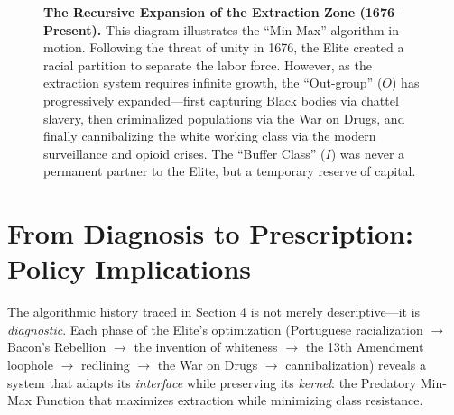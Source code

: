 \documentclass[12pt]{article}
\begin{document}
\begin{figure}[h]
    \caption{\textbf{The Recursive Expansion of the Extraction Zone (1676--Present).} This diagram illustrates the ``Min-Max'' algorithm in motion. Following the threat of unity in 1676, the Elite created a racial partition to separate the labor force. However, as the extraction system requires infinite growth, the ``Out-group'' ($O$) has progressively expanded---first capturing Black bodies via chattel slavery, then criminalized populations via the War on Drugs, and finally cannibalizing the white working class via the modern surveillance and opioid crises. The ``Buffer Class'' ($I$) was never a permanent partner to the Elite, but a temporary reserve of capital.}
    \label{fig:extraction_zone}
\end{figure}

\section{From Diagnosis to Prescription: Policy Implications}

The algorithmic history traced in Section 4 is not merely descriptive---it is \textit{diagnostic}. Each phase of the Elite's optimization (Portuguese racialization $\rightarrow$ Bacon's Rebellion $\rightarrow$ the invention of whiteness $\rightarrow$ the 13th Amendment loophole $\rightarrow$ redlining $\rightarrow$ the War on Drugs $\rightarrow$ cannibalization) reveals a system that adapts its \textit{interface} while preserving its \textit{kernel}: the Predatory Min-Max Function that maximizes extraction while minimizing class resistance.
\end{document}
